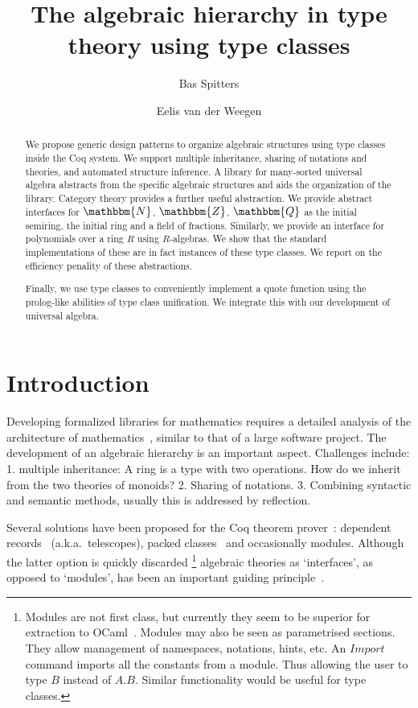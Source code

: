 \documentclass[a4paper,10pt, runningheads]{llncs}
\newcommand{\N}{\ensuremath{\mathbbm{N}}}
\newcommand{\Z}{\ensuremath{\mathbbm{Z}}}
\newcommand{\Q}{\ensuremath{\mathbbm{Q}}}
\newcommand{\Conid}[1]{\mathit{#1}}
\begin{document}
\title{The algebraic hierarchy in type theory using type classes}
\author{Bas Spitters \and Eelis van der Weegen}
\maketitle
\begin{abstract}
We propose generic design patterns to organize algebraic structures using type classes inside the
Coq system. We support multiple inheritance, sharing of notations and theories, and automated
structure inference. A library for many-sorted universal algebra abstracts from the specific
algebraic structures and aids the organization of the library. Category theory provides a further
useful abstraction. We provide abstract
interfaces for $\N$, $\Z$, $\Q$ as the initial semiring, the initial ring and a field of
fractions. Similarly, we provide an interface for polynomials over a ring $R$ using $R$-algebras.
We show that the standard implementations of these are in fact instances of these type classes.
We report on the efficiency penality of these abstractions.

Finally, we use type classes to conveniently implement a quote function using the prolog-like
abilities of type class unification. We integrate this with our development of universal algebra.
\end{abstract}

\section{Introduction}
Developing formalized libraries for mathematics requires a detailed analysis of the
architecture of mathematics~\cite{C-corn,DBLP:conf/types/HaftmannW08}, similar to that of a large
software project.
The development of an algebraic hierarchy is an important aspect. Challenges include: 1. multiple
inheritance: A ring is a type with two operations. How do we inherit from the two theories of
monoids? 2. Sharing of notations. 3. Combining syntactic and semantic methods, usually this is
addressed by reflection.

Several solutions have been proposed for the Coq theorem prover~\cite{Coq,BC04}: dependent
records~\cite{DBLP:journals/jsc/GeuversPWZ02} (a.k.a.\ telescopes), packed classes~\cite{Packed} and
occasionally modules. Although the latter option is quickly discarded%
\footnote{Modules are not first class, but currently they seem to be superior for extraction to
OCaml~\cite{letouzey02}. Modules may also be seen as parametrised sections. They allow management
of namespaces, notations, hints, etc. An \ensuremath{\Conid{Import}} command imports all the constants from a
module. Thus allowing the user to type \ensuremath{\Conid{B}} instead of \ensuremath{\Conid{A.B}}. Similar functionality would be useful
for type classes.}
algebraic theories as `interfaces', as opposed to `modules', has been an important
guiding principle~\cite{Packed}.
\end{document}
